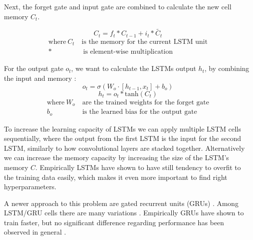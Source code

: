 \documentclass[draft,final,oneside]{vutinfth} %
\begin{document}
Next, the forget gate and input gate are combined to calculate the new cell memory $C_t$.

\begin{equation}
C_t=f_t*C_{t-1} + i_t*\widetilde{C_t}
\end{equation}
\begin{align*}
\text{where}~C_t~&\text{is the memory for the current LSTM unit} \\
*&~\text{is element-wise multiplication}
\end{align*}


For the output gate $o_t$, we want to calculate the LSTMs output $h_t$, by combining the input and memory :
\begin{equation}
o_t=\sigma\left(W_o \cdot \left[ h_{t-1}, x_t\right] + b_o \right)
\end{equation}
\begin{equation}
h_t = o_t * \text{tanh}\left(C_t\right)
\end{equation}
\begin{align*}
\text{where}~W_o&~\text{are the trained weights for the forget gate} \\
b_o&~\text{is the learned bias for the output gate}
\end{align*}

To increase the learning capacity of LSTMs we can apply multiple LSTM cells sequentially, where the output from the first LSTM is the input for the second LSTM, similarly to how convolutional layers are stacked together. Alternatively we can increase the memory capacity by increasing the size of the LSTM's memory $C$. Empirically LSTMs have shown to have still tendency to overfit to the training data easily, which makes it even more important to find right hyperparameters.

A newer approach to this problem are gated recurrent units (GRUs) \cite{gru}. Among LSTM/GRU cells there are many variations \cite{Goodfellow-et-al-2016}. Empirically GRUs have shown to train faster, but no significant difference regarding performance has been observed in general \cite{gru}.
\end{document}
